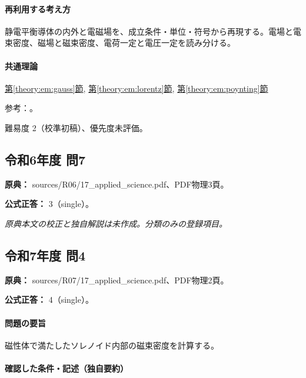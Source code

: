 \paragraph{再利用する考え方} 静電平衡導体の内外と電磁場を、成立条件・単位・符号から再現する。電場と電束密度、磁場と磁束密度、電荷一定と電圧一定を読み分ける。

\paragraph{共通理論} \hyperref[theory:em:gauss]{第\ref*{theory:em:gauss}節}, \hyperref[theory:em:lorentz]{第\ref*{theory:em:lorentz}節}, \hyperref[theory:em:poynting]{第\ref*{theory:em:poynting}節}

\par 参考：\cite{mit_em04,mit_em13,mit_lorentz}。

\par 難易度 2（校準初稿）、優先度未評価。

\subsection{令和6年度 問7}
\label{q:r06-reg-applied-07}

\noindent\textbf{原典：} sources/R06/17\_applied\_science.pdf、PDF物理3頁。

\textbf{公式正答：} 3（single）。

\par\textit{原典本文の校正と独自解説は未作成。分類のみの登録項目。}

\subsection{令和7年度 問4}
\label{q:r07-reg-applied-04}

\noindent\textbf{原典：} sources/R07/17\_applied\_science.pdf、PDF物理2頁。

\textbf{公式正答：} 4（single）。

\paragraph{問題の要旨} 磁性体で満たしたソレノイド内部の磁束密度を計算する。

\paragraph{確認した条件・記述（独自要約）}\mbox{}\par


